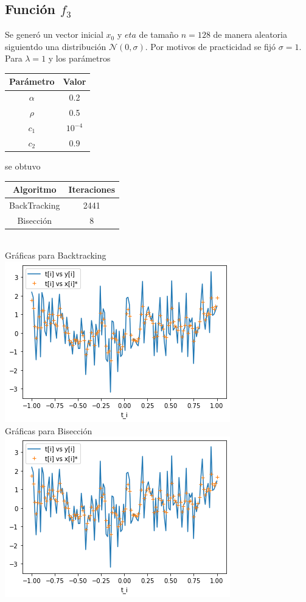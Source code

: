 \documentclass[11pt,letterpaper]{article}
\theoremstyle{definition}
\theoremstyle{definition}
\theoremstyle{definition}
\begin{document}
\subsection{Función $ f_3 $}
Se generó un vector inicial $ x_0 $ y $ eta $ de tamaño $ n = 128 $ de manera aleatoria siguientdo una distribución $ \mathcal{N}(0, \sigma) $. Por motivos de practicidad se fijó $ \sigma = 1 $.
\\
Para $ \lambda = 1 $ y los parámetros
\begin{center}
	\begin{tabular}{cc}
		\hline
		Parámetro & Valor \\
		\hline
		$\alpha $ & 0.2 \\
		$ \rho $  & 0.5 \\
		$ c_1 $ & $ 10^{-4} $ \\
		$ c_2 $  & $ 0.9 $ \\
		\hline
	\end{tabular}
\end{center}
se obtuvo
\begin{center}
	\begin{tabular}{cc}
		\hline
		Algoritmo & Iteraciones \\
		\hline
		BackTracking & 2441 \\
		Bisección    & 8 \\
		\hline
	\end{tabular}
	\\
	Gráficas para Backtracking
	\\
	\includegraphics[width=0.8\linewidth]{graficas/f3_backtracking_lambda1}
	\\
	Gráficas para Bisección
	\\
	\includegraphics[width=0.8\linewidth]{graficas/f3_bisection_lambda1}
\end{center}
\end{document}
